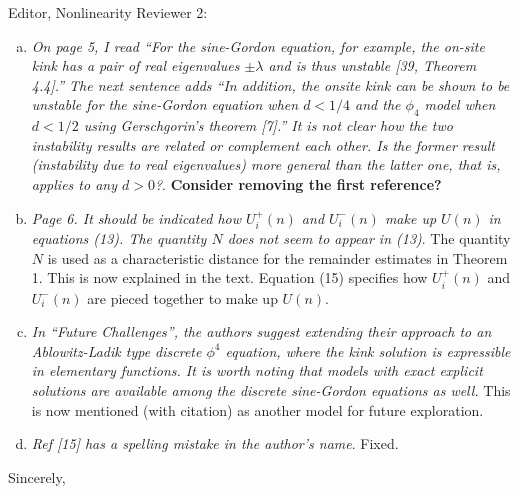 \documentclass[11pt]{letter}
\begin{document}
\begin{letter}{Editor, Nonlinearity}
Reviewer 2:
\begin{enumerate}[(a)]
\item \emph{On page 5, I read ``For the sine-Gordon equation, for example, the on-site kink has a pair of real eigenvalues $\pm \lambda$ and is thus unstable [39, Theorem 4.4].'' The next sentence adds ``In addition, the onsite kink can be shown to be unstable for the sine-Gordon equation when $d < 1/4$ and the $\phi_4$ model when $d < 1/2$ using Gerschgorin’s theorem [7].'' It is not clear how the two instability results are related or complement each other. Is the former result (instability due to real eigenvalues) more general than the latter one, that is, applies to any $d > 0$?}. \textbf{Consider removing the first reference?}

\item \emph{Page 6. It should be indicated how $U_i^+(n)$ and $U_i^-(n)$ make up $U(n)$ in equations (13). The quantity $N$ does not seem to appear in (13)}. The quantity $N$ is used as a characteristic distance for the remainder estimates in Theorem 1. This is now explained in the text. Equation (15) specifies how $U_i^+(n)$ and $U_i^-(n)$ are pieced together to make up $U(n)$.

\item \emph{In ``Future Challenges'', the authors suggest extending their approach to an Ablowitz-Ladik type discrete $\phi^4$ equation, where the kink solution is expressible in elementary functions. It is worth noting that models with exact explicit solutions are available among the discrete sine-Gordon equations as well.} This is now mentioned (with citation) as another model for future exploration.

\item \emph{Ref [15] has a spelling mistake in the author’s name}. Fixed.

\end{enumerate}

\closing{Sincerely,}

\end{letter}
\end{document}
